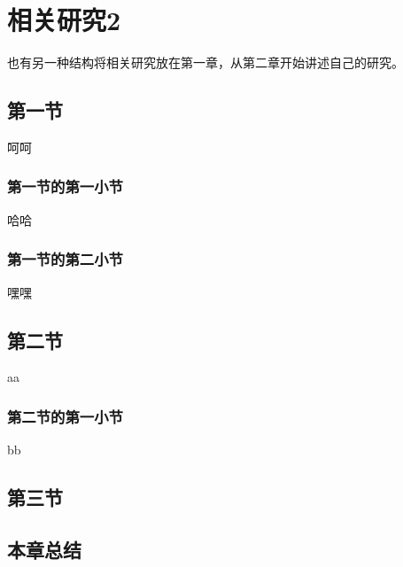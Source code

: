 
\chapter{相关研究2}

也有另一种结构将相关研究放在第一章，从第二章开始讲述自己的研究。

\section{第一节}

呵呵

\subsection{第一节的第一小节}

哈哈

\subsection{第一节的第二小节}

嘿嘿

\section{第二节}

aa

\subsection{第二节的第一小节}

bb

\section{第三节}

\section{本章总结}


\ifprint
\newpage
\thispagestyle{empty}
\mbox{}

\clearpage
\setcounter{page}{10}
\fi